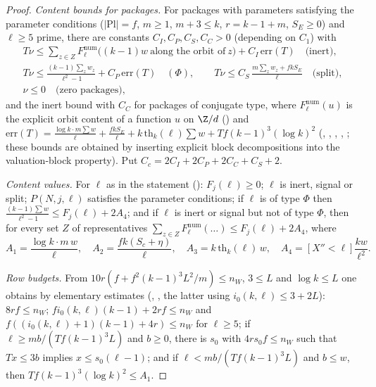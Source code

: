 \begin{proof}
\emph{Content bounds for packages.} For packages with parameters satisfying the parameter conditions ($|\mathrm{Pl}|=f$, $m\ge1$,
$m+3\le k$, $r=k-1+m$, $S_E\ge0$) and $\ell\ge5$ prime, there are constants $C_I,C_P,C_S,C_C>0$ (depending on $C_1$) with
\begin{gather*}
T\nu\le\sum_{z\in Z}F^{\mathrm{num}}_\ell\bigl((k-1)w\ \text{along the orbit of}\ z\bigr)+C_I\,\mathrm{err}(T)\quad\text{(inert)},\\
T\nu\le\frac{(k-1)\sum_zw_z}{\ell^2-1}+C_P\,\mathrm{err}(T)\quad(\Phi),\qquad
T\nu\le C_S\,\frac{m\sum_zw_z+fkS_E}{\ell}\quad\text{(split)},\\ \nu\le0\quad\text{(zero packages)},
\end{gather*}
and the inert bound with $C_C$ for packages of conjugate type, where $F^{\mathrm{num}}_\ell(u)$ is the explicit orbit content of a
function $u$ on $\Z/d$ () and $\mathrm{err}(T)=\frac{\log k\cdot m\sum w}{\ell}+\frac{fkS_E}{\ell}
+k\,\mathrm{th}_k(\ell)\sum w+Tf(k-1)^3(\log k)^2$ (,
, ,
, ; these bounds are
obtained by inserting explicit block decompositions into the valuation-block property). Put $C_c=2C_I+2C_P+2C_C+C_S+2$.

\emph{Content values.} For $\ell$ as in the statement (): $F_j(\ell)\ge0$; $\ell$ is inert,
signal or split; $P(N,j,\ell)$ satisfies the parameter conditions; if $\ell$ is of type $\Phi$ then
$\frac{(k-1)\sum w}{\ell^2-1}\le F_j(\ell)+2A_4$; and if $\ell$ is inert or signal but not of type $\Phi$, then for every set $Z$ of
representatives $\sum_{z\in Z}F^{\mathrm{num}}_\ell(\dots)\le F_j(\ell)+2A_4$, where
\[
A_1=\frac{\log k\cdot m\,w}{\ell},\quad A_2=\frac{fk(S_c+\eta)}{\ell},\quad A_3=k\,\mathrm{th}_k(\ell)\,w,\quad A_4=[X''<\ell]\frac{kw}{\ell^2}.
\]

\emph{Row budgets.} From $10r(f+f^2(k-1)^3L^2/m)\le n_W$, $3\le L$ and $\log k\le L$ one obtains by elementary estimates
(, , the latter using
$i_0(k,\ell)\le3+2L$): $8rf\le n_W$; $fi_0(k,\ell)(k-1)+2rf\le n_W$ and $f((i_0(k,\ell)+1)(k-1)+4r)\le n_W$ for $\ell\ge5$; if
$\ell\ge mb/(Tf(k-1)^3L)$ and $b\ge0$, there is $s_0$ with $4rs_0f\le n_W$ such that $Tx\le3b$ implies $x\le s_0(\ell-1)$; and if
$\ell<mb/(Tf(k-1)^3L)$ and $b\le w$, then $Tf(k-1)^3(\log k)^2\le A_1$.


\end{proof}
